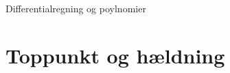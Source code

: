 \documentclass[12pt]{article}
\begin{document}






\begin{center}
\Huge
Differentialregning og poylnomier
\end{center}

\section*{Toppunkt og hældning}
\end{document}
